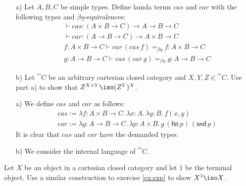 \begin{exercise}
    \label{ex:exp}
    \begin{itemize}
        \item[a)] Let $A, B, C$ be simple types.
            Define lamda terms $cas$ and $car$ with the following types and $\beta\eta$-equivalences:
            \begin{align*}
                & \vdash cas: (A \times B \to C) \to A \to B \to C \\
                & \vdash car: (A \to B \to C) \to A \times B \to C\\
                & f: A \times B \to C \vdash car\, (cas\, f) =_{\beta\eta} f : A \times B \to C \\
                & g: A \to B \to C \vdash cas\, (car\, g) =_{\beta\eta} g : A \to B \to C
            \end{align*}
        \item[b)] Let $\cat{C}$ be an arbitrary cartesian closed category and $X, Y, Z \in \cat{C}$.
            Use part a) to show that $Z^{X \times Y} \iso (Z^Y)^X$.
    \end{itemize}
\end{exercise}
\begin{answer}
    \begin{itemize}
        \item[a)] We define $cas$ and $car$ as follows:
            \begin{align*}
                & cas := \lambda f: A \times B \to C.\,\lambda x: A.\,\lambda y: B.\,f(x, y) \\
                & car := \lambda g: A \to B \to C.\,\lambda p: A \times B.\,g\,(\mathsf{fst}\,p)\,(\mathsf{snd}\,p)
            \end{align*}
            It is clear that $cas$ and $car$ have the demanded types.
        \item[b)] We consider the internal language of $\cat{C}$.
    \end{itemize}
\end{answer}

\begin{exercise}
    Let $X$ be an object in a cartesian closed category and let $1$ be the terminal object.
    Use a similar construction to exercise \ref{ex:exp} to show $X^1 \iso X$.
\end{exercise}
\begin{answer}
\end{answer}

